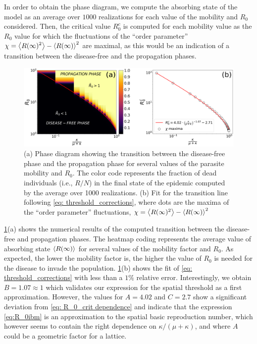 In order to obtain the phase diagram, we compute the absorbing state of the
model as an average over $1000$ realizations for each value of the mobility and
$R_0$ considered. Then, the critical value $R_0^c$ is computed for each
mobility value as the $R_0$ value for which the fluctuations of the ``order
parameter'' $\displaystyle \chi=\left<{R(\infty})^2\right>-\left<R(\infty)\right>^2$ are
maximal, as this would be an indication of a transition between the
disease-free and the propagation phases.

\begin{figure}[H]
    \centering
    \includegraphics[width=1\textwidth]{Figures/PhaseDiagram.png}
    \caption[Phase diagram and fit for the transition between the disease-free
        and propagation phases]{(a) Phase diagram showing the transition
        between the disease-free phase and the propagation phase for several
        values of the parasite mobility and $R_0$. The color code represents
        the fraction of dead individuals (i.e., $R/N$) in the final state of
        the
        epidemic computed by the average over 1000 realizations. (b) Fit for
        the transition line following \cref{eq: threshold_corrections}, where
        dots are the maxima of the ``order parameter'' fluctuations,
        $\chi=\left<{R(\infty})^2\right>-\left<R(\infty)\right>^2$}
    \label{fig:Phase_diagram}
\end{figure}

\cref{fig:Phase_diagram}(a) shows the numerical results of the computed
transition between the disease-free and propagation phases. The heatmap coding
represents the average value of absorbing state $\left<R(\infty)\right>$ for several
values of the mobility factor and $R_0$. As expected, the lower the mobility
factor is, the higher the value of $R_0$ is needed for the disease to invade
the population. \cref{fig:Phase_diagram}(b) shows the fit of \cref{eq:
    threshold_corrections} with less than a $1\%$ relative error.
Interestingly, we obtain $B=1.07\approx1$ which validates our expression for
the spatial threshold as a first approximation. However, the values for
$A=4.02$ and $C=2.7$ show a significant deviation from \cref{eq: R_0_crit
    dependence} and indicate that the expression \cref{eq:R_0ibm} is  an
approximation to the spatial basic reproduction number, which however seems to
contain the right dependence on $\kappa/(\mu+\kappa)$, and where $A$ could be a
geometric factor for a lattice.

